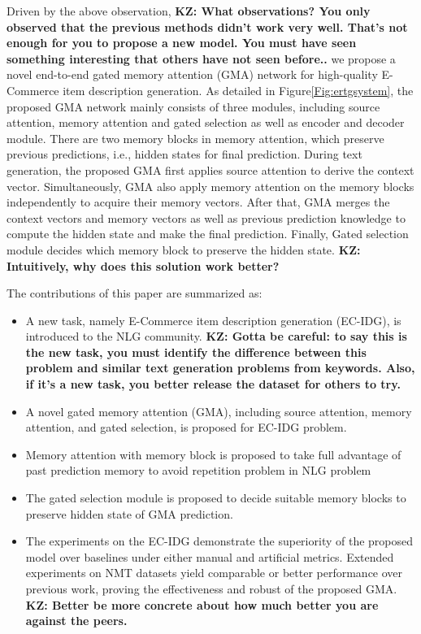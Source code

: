 \documentclass[letterpaper]{article} %
\newcommand{\KZ}[1]{{\bf \color{red} KZ: #1}}
\begin{document}
Driven by the above observation, \KZ{What observations? You only observed
that the previous methods didn't work very well. That's not enough for you
to propose a new model. You must have seen something interesting that others
have not seen before..} we propose a novel end-to-end gated memory attention (GMA) network for high-quality E-Commerce item description generation.
As detailed in Figure\ref{Fig:ertgsystem}, the proposed GMA network mainly consists of three modules, including source attention, memory attention and gated selection as well as encoder and decoder module.
There are two memory blocks in memory attention, which preserve previous predictions, i.e., hidden states for final prediction.
During text generation, the proposed GMA first applies source attention to derive the context vector.
Simultaneously, GMA also apply memory attention on the memory blocks independently to acquire their memory vectors. 
After that, GMA merges the context vectors and memory vectors as well as previous prediction knowledge to compute the hidden state and make the final prediction.
Finally, Gated selection module decides which memory block to preserve the hidden state.
\KZ{Intuitively, why does this solution work better?}

The contributions of this paper are summarized as:
\begin{itemize}
\item A new task, namely E-Commerce item description generation (EC-IDG), is introduced to the NLG community. \KZ{Gotta be careful: to say this is the new
task, you must identify the difference between this problem and similar
text generation problems from keywords. Also, if it's a new task, you better
release the dataset for others to try.}
\item A novel gated memory attention (GMA), including source attention, memory attention, and gated selection, is proposed for EC-IDG problem.
\item Memory attention with memory block is proposed to take full advantage of past prediction memory to avoid repetition problem in NLG problem
\item The gated selection module is proposed to decide suitable memory blocks to preserve hidden state of GMA prediction.

\item  The experiments on the EC-IDG demonstrate the superiority of the proposed model over baselines under either manual and artificial metrics. Extended experiments on NMT datasets yield comparable or better performance over previous work, proving the effectiveness and robust of the proposed GMA. \KZ{Better be
 more concrete about how much better you are against the peers.}
\end{itemize}
\end{document}
